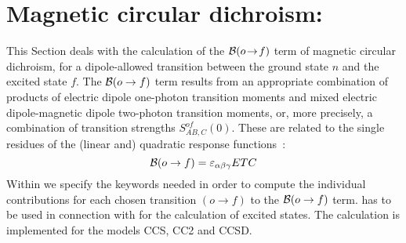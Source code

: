 
\section{Magnetic circular dichroism: }\label{sec:ccmcd}

This Section deals with the calculation of the 
${\cal{B}}(o\!\to\!f)$ term of magnetic circular dichroism,
for a dipole-allowed transition between the ground state $n$ and 
the excited state $f$.
The ${\cal{B}}(o\to f)$ term results from an appropriate combination of
products of electric dipole one-photon transition moments
and mixed electric dipole-magnetic dipole
two-photon transition moments,
or, more precisely, a combination of transition strengths
$S_{AB,C}^{of}(0)$.
These are related to the single residues of the (linear and) 
quadratic response functions~\cite{Coriani:MCDRSP,Coriani:MOACC,Coriani:PHD}:
\[
{\cal{B}}(o\to f) = \varepsilon_{\alpha\beta\gamma} ETC
\]
%
\noindent
Within  we specify the keywords needed in order
to compute the individual 
contributions for each chosen transition $(o\to f)$ to the
${\cal{B}}(o\to f)$ term.  has to be used in 
connection with  for the calculation of 
excited states.
The calculation is implemented for the models CCS, CC2 and CCSD.


\begin{center}
\end{center}

